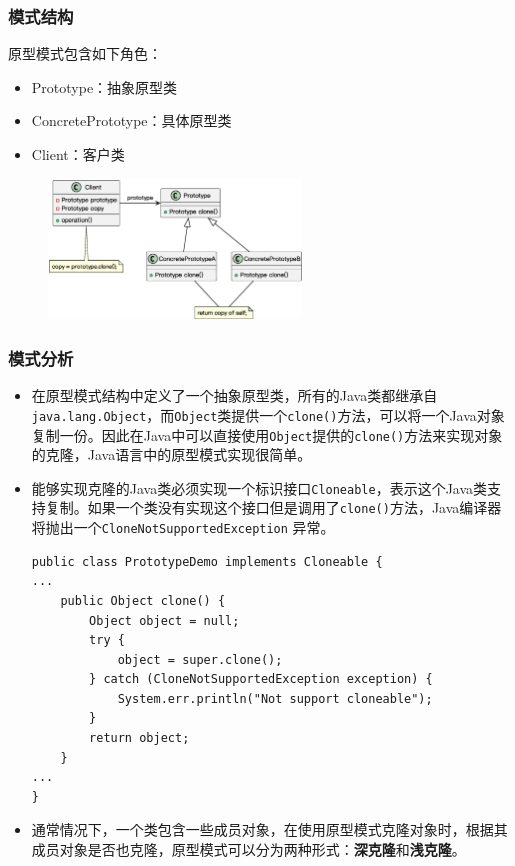 \subsubsection{模式结构}
原型模式包含如下角色：
\vspace{-0.8em}
\begin{multicols}{2}
    \begin{itemize}
        \item Prototype：抽象原型类
        \item ConcretePrototype：具体原型类
        \item Client：客户类
    \end{itemize}
\end{multicols}
\vspace{-1em}

\begin{figure}[H]
    \vspace{-0.5em}
	\centering
	\includegraphics[width=0.6\textwidth]{images/原型模式结构.eps}
    \vspace{-1em}
\end{figure}

\subsubsection{模式分析}
\begin{itemize}
    \item 在原型模式结构中定义了一个抽象原型类，所有的Java类都继承自\;\verb|java.lang.Object|，而\;\verb|Object|类提供一个\;\verb|clone()|\;方法，可以将一个Java对象复制一份。因此在Java中可以直接使用\;\verb|Object|\;提供的\;\verb|clone()|\;方法来实现对象的克隆，Java语言中的原型模式实现很简单。
    \item 能够实现克隆的Java类必须实现一个标识接口\;\verb|Cloneable|，表示这个Java类支持复制。如果一个类没有实现这个接口但是调用了\verb|clone()|方法，Java编译器将抛出一个\verb|CloneNotSupportedException| 异常。
    \begin{lstlisting}
public class PrototypeDemo implements Cloneable {
...
    public Object clone() {
        Object object = null; 
        try {
            object = super.clone();
        } catch (CloneNotSupportedException exception) { 
            System.err.println("Not support cloneable");
        }
        return object; 
    }
...
}
    \end{lstlisting}
    \item 通常情况下，一个类包含一些成员对象，在使用原型模式克隆对象时，根据其成员对象是否也克隆，原型模式可以分为两种形式：\textbf{深克隆}和\textbf{浅克隆}。
\end{itemize}

